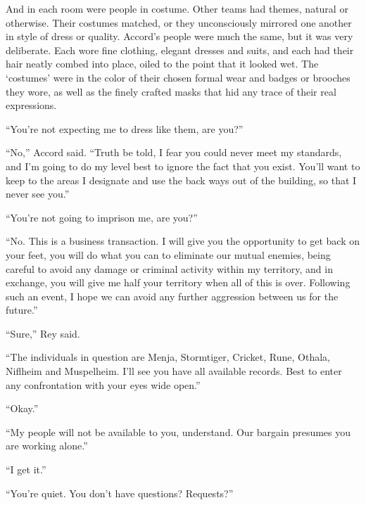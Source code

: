 And in each room were people in costume.  Other teams had themes, natural or otherwise.  Their costumes matched, or they unconsciously mirrored one another in style of dress or quality.  Accord's people were much the same, but it was very deliberate.  Each wore fine clothing, elegant dresses and suits, and each had their hair neatly combed into place, oiled to the point that it looked wet.  The `costumes' were in the color of their chosen formal wear and badges or brooches they wore, as well as the finely crafted masks that hid any trace of their real expressions.



``You're not expecting me to dress like them, are you?''



``No,'' Accord said.  ``Truth be told, I fear you could never meet my standards, and I'm going to do my level best to ignore the fact that you exist.  You'll want to keep to the areas I designate and use the back ways out of the building, so that I never see you.''



``You're not going to imprison me, are you?''



``No.  This is a business transaction.  I will give you the opportunity to get back on your feet, you will do what you can to eliminate our mutual enemies, being careful to avoid any damage or criminal activity within my territory, and in exchange, you will give me half your territory when all of this is over.  Following such an event, I hope we can avoid any further aggression between us for the future.''



``Sure,'' Rey said.



``The individuals in question are Menja, Stormtiger, Cricket, Rune, Othala, Niflheim and Muspelheim.  I'll see you have all available records.  Best to enter any confrontation with your eyes wide open.''



``Okay.''



``My people will not be available to you, understand.  Our bargain presumes you are working alone.''



``I get it.''



``You're quiet.  You don't have questions?  Requests?''




